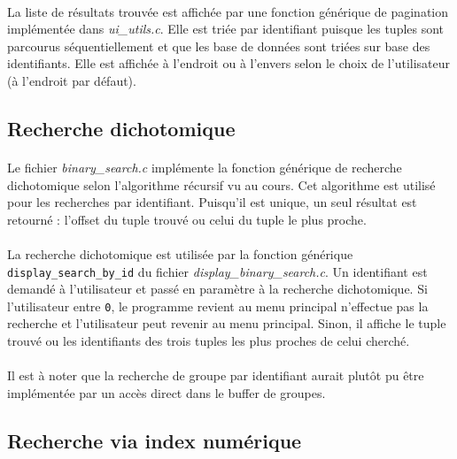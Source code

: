 \documentclass{article}
\begin{document}
    \paragraph{}
    La liste de résultats trouvée est affichée par une fonction générique de pagination implémentée dans \emph{ui\_utils.c}. Elle est triée par identifiant puisque les tuples sont parcourus séquentiellement et que les base de données sont triées sur base des identifiants. Elle est affichée à l'endroit ou à l'envers selon le choix de l'utilisateur (à l'endroit par défaut).


    \subsection{Recherche dichotomique}
    \paragraph{}
    Le fichier \emph{binary\_search.c} implémente la fonction générique de recherche dichotomique selon l'algorithme récursif vu au cours. Cet algorithme est utilisé pour les recherches par identifiant. Puisqu'il est unique, un seul résultat est retourné : l'offset du tuple trouvé ou celui du tuple le plus proche.

    \paragraph{}
    La recherche dichotomique est utilisée par la fonction générique \texttt{display\_search\_by\_id} du fichier \emph{display\_binary\_search.c}. Un identifiant est demandé à l'utilisateur et passé en paramètre à la recherche dichotomique. Si l'utilisateur entre \texttt{0}, le programme revient au menu principal n'effectue pas la recherche et l'utilisateur peut revenir au menu principal. Sinon, il affiche le tuple trouvé ou les identifiants des trois tuples les plus proches de celui cherché.

    \paragraph{}
    Il est à noter que la recherche de groupe par identifiant aurait plutôt pu être implémentée par un accès direct dans le buffer de groupes.


    \subsection{Recherche via index numérique}
\end{document}
